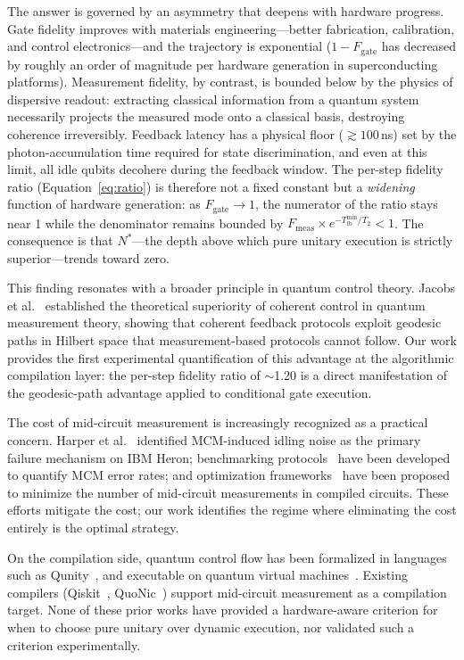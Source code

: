 \documentclass[11pt]{article}
\begin{document}
The answer is governed by an asymmetry that deepens with hardware progress.
Gate fidelity improves with materials engineering---better fabrication, calibration, and control electronics---and the trajectory is exponential ($1 - F_\text{gate}$ has decreased by roughly an order of magnitude per hardware generation in superconducting platforms).
Measurement fidelity, by contrast, is bounded below by the physics of dispersive readout: extracting classical information from a quantum system necessarily projects the measured mode onto a classical basis, destroying coherence irreversibly.
Feedback latency has a physical floor ($\gtrsim 100\,$ns) set by the photon-accumulation time required for state discrimination, and even at this limit, all idle qubits decohere during the feedback window.
The per-step fidelity ratio (Equation~\ref{eq:ratio}) is therefore not a fixed constant but a \emph{widening} function of hardware generation: as $F_\text{gate} \to 1$, the numerator of the ratio stays near 1 while the denominator remains bounded by $F_\text{meas} \times e^{-T_\text{fb}^\text{min}/T_2} < 1$.
The consequence is that $N^*$---the depth above which pure unitary execution is strictly superior---trends toward zero.

This finding resonates with a broader principle in quantum control theory.
Jacobs et al.~\cite{jacobs2014} established the theoretical superiority of coherent control in quantum measurement theory, showing that coherent feedback protocols exploit geodesic paths in Hilbert space that measurement-based protocols cannot follow.
Our work provides the first experimental quantification of this advantage at the algorithmic compilation layer: the per-step fidelity ratio of $\sim$1.20 is a direct manifestation of the geodesic-path advantage applied to conditional gate execution.

The cost of mid-circuit measurement is increasingly recognized as a practical concern.
Harper et al.~\cite{harper2026} identified MCM-induced idling noise as the primary failure mechanism on IBM Heron; benchmarking protocols~\cite{hothem2025} have been developed to quantify MCM error rates; and optimization frameworks~\cite{mcm_opt2025} have been proposed to minimize the number of mid-circuit measurements in compiled circuits.
These efforts mitigate the cost; our work identifies the regime where eliminating the cost entirely is the optimal strategy.

On the compilation side, quantum control flow has been formalized in languages such as Qunity~\cite{mints2025}, and executable on quantum virtual machines~\cite{qvm2025}.
Existing compilers (Qiskit~\cite{qiskit}, QuoNic~\cite{quonic2026}) support mid-circuit measurement as a compilation target.
None of these prior works have provided a hardware-aware criterion for when to choose pure unitary over dynamic execution, nor validated such a criterion experimentally.
\end{document}
